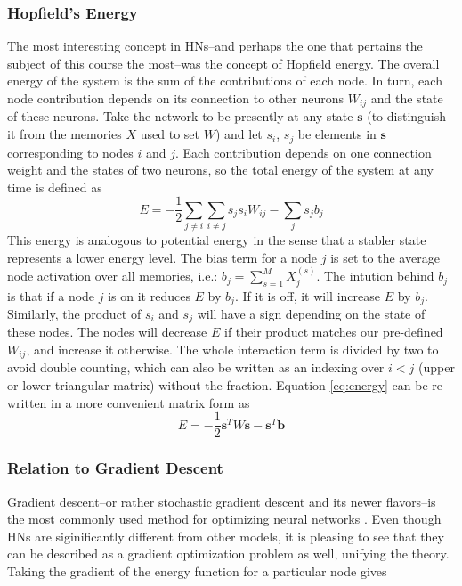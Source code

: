 \documentclass[11pt]{article}
\begin{document}
	\subsubsection{Hopfield's Energy}
	The most interesting concept in HNs–and perhaps the one that pertains the subject of this course the most–was the concept of Hopfield energy. 
	The overall energy of the system is the sum of the contributions of each node. 
	In turn, each node contribution depends on its connection to other neurons $W_{ij}$ and the state of these neurons. 
	Take the network to be presently at any state $\mathbf{s}$ (to distinguish it from the memories $X$ used to set $W$) and let $s_i$, $s_j$ be elements in $\mathbf{s}$ corresponding to nodes $i$ and $j$. 
	Each contribution depends on one connection weight and the states of two neurons, so the total energy of the system at any time is defined as	
	\begin{equation}\label{eq:energy}
		E = - \frac{1}{2}\sum^{}_{j \neq i}  \sum^{}_{i \neq j}  s_j s_i W_{ij} - \sum^{}_{j} s_j b_j
	\end{equation}
	This energy is analogous to potential energy in the sense that a stabler state represents a lower energy level.
	The bias term for a node $j$ is set to the average node activation over all memories, i.e.: $b_j = \sum^{M}_{s=1} X_j^{(s)}$. 
	The intution behind $b_j$ is that if a node $j$ is on it reduces $E$ by $b_j$. If it is off, it will increase $E$ by $b_j$. 
	Similarly, the product of $s_i$ and $s_j$ will have a sign depending on the state of these nodes. 
	The nodes will decrease $E$ if their product matches our pre-defined $W_{ij}$, and increase it otherwise. 
	The whole interaction term is divided by two to avoid double counting, which can also be written as an indexing over  $i < j$ (upper or lower triangular matrix) without the fraction.
	Equation \ref{eq:energy} can be re-written in a more convenient matrix form as
	\begin{equation}\label{eq:energymatrix}
		E = -\frac{1}{2}\mathbf{s}^T W\mathbf{s} - \mathbf{s}^T \mathbf{b}	
	\end{equation}
	

	\subsubsection{Relation to Gradient Descent}
	Gradient descent–or rather stochastic gradient descent and its newer flavors–is the most commonly used method for optimizing neural networks \cite{deeplearning2015}.
	Even though HNs are siginificantly different from other models, it is pleasing to see that they can be described as a gradient optimization problem as well, unifying the theory. 
	Taking the gradient of the energy function for a particular node gives
	
\end{document}

